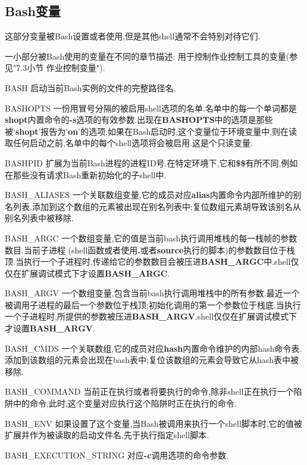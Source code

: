\documentclass[draft,openany]{book}
\begin{document}
\begin{CJK}{UTF8}{gbsn}
    \section{Bash变量}
    这部分变量被Bash设置或者使用,但是其他shell通常不会特别对待它们.\par
    一小部分被Bash使用的变量在不同的章节描述: 用于控制作业控制工具的变量(参见"7.3小节 作业控制变量").
    \begin{basedescript}{\desclabelstyle{\nextlinelabel}\desclabelwidth{2.5em}}
    \item[BASH] 启动当前Bash实例的文件的完整路径名.
    \item[BASHOPTS] 一份用冒号分隔的被启用shell选项的名单.名单中的每一个单词都是\textbf{shopt}内置命令的\textbf{-s}选项的有效参数.出现在\textbf{BASHOPTS}中的选项是那些被`\textbf{shopt}'报告为'\textbf{on}'的选项.如果在Bash启动时,这个变量位于环境变量中,则在读取任何启动之前,名单中的每个shell选项将会被启用.这是个只读变量.
    \item[BASHPID] 扩展为当前Bash进程的进程ID号.在特定环境下,它和\textbf{\$\$}有所不同,例如在那些没有请求Bash重新初始化的子shell中.
    \item[BASH\_ALIASES] 一个关联数组变量,它的成员对应\textbf{alias}内置命令内部所维护的别名列表.添加到这个数组的元素被出现在别名列表中;复位数组元素胡导致该别名从别名列表中被移除.
    \item[BASH\_ARGC] 一个数组变量,它的值是当前bash执行调用堆栈的每一栈帧的参数数目.当前子进程 (shell函数或者使用\textbf{.}或者\textbf{source}执行的脚本)的参数数目位于栈顶.当执行一个子进程时,传递给它的参数数目会被压进\textbf{BASH\_ARGC}中.shell仅仅在扩展调试模式下才设置\textbf{BASH\_ARGC}.
    \item[BASH\_ARGV] 一个数组变量,包含当前bash执行调用堆栈中的所有参数.最近一个被调用子进程的最后一个参数位于栈顶;初始化调用的第一个参数位于栈底.当执行一个子进程时,所提供的参数被压进\textbf{BASH\_ARGV}.shell仅仅在扩展调试模式下才设置\textbf{BASH\_ARGV}.
    \item[BASH\_CMDS] 一个关联数组,它的成员对应\textbf{hash}内置命令维护的内部hash命令表.添加到该数组的元素会出现在bash表中;复位该数组的元素会导致它从hash表中被移除.
    \item[BASH\_COMMAND] 当前正在执行或者将要执行的命令,除非shell正在执行一个陷阱中的命令,此时,这个变量对应执行这个陷阱时正在执行的命令.
    \item[BASH\_ENV] 如果设置了这个变量,当Bash被调用来执行一个shell脚本时,它的值被扩展并作为被读取的启动文件名,先于执行指定shell脚本.
    \item[BASH\_EXECUTION\_STRING] 对应\textbf{-c}调用选项的命令参数.

\end{basedescript}
\end{CJK}
\end{document}
